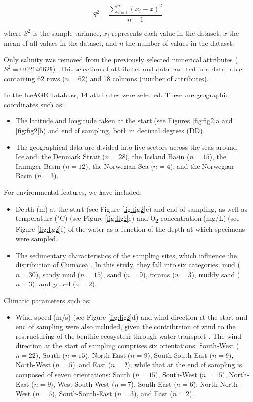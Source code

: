 \begin{equation}\label{variance}
    S^2 = \frac{\sum_{i=1}^{n} (x_i - \bar{x})^2}{n-1}
\end{equation}

where $S^2$ is the sample variance, $x_i$ represents each value in the dataset, $\bar{x}$ the mean of all values in the dataset, and $n$ the number of values in the dataset.

Only salinity was removed from the previously selected numerical attributes ($S^2 = 0.02146629$). This selection of attributes and data resulted in a data table containing 62 rows ($n=62$) and 18 columns (number of attributes). 

In the IceAGE database, 14 attributes were selected. These are geographic coordinates such as: 

\begin{itemize}
\item The latitude and longitude taken at the start (see Figures \ref{fig:fig2}a and \ref{fig:fig2}b) and end of sampling, both in decimal degrees (DD).
\item The geographical data are divided into five sectors across the seas around Iceland: the Denmark Strait ($n=28$), the Iceland Basin ($n=15$), the Irminger Basin ($n=12$), the Norwegian Sea ($n=4$), and the Norwegian Basin ($n=3$). 
\end{itemize}

For environmental features, we have included:
\begin{itemize}
\item Depth (m) at the start (see Figure \ref{fig:fig2}c) and end of sampling, as well as temperature ($^\circ$C) (see Figure \ref{fig:fig2}e) and O\textsubscript{2} concentration (mg/L) (see Figure \ref{fig:fig2}f) of the water as a function of the depth at which specimens were sampled. 
\item The sedimentary characteristics of the sampling sites, which influence the distribution of Cumacea \citep{uhlir_adding_2021}. In this study, they fall into six categories: mud ($n=30$), sandy mud ($n=15$), sand ($n=9$), forams ($n=3$), muddy sand ($n=3$), and gravel ($n=2$).
\end{itemize}

Climatic parameters such as: 
\begin{itemize}
\item Wind speed (m/s) (see Figure \ref{fig:fig2}d) and wind direction at the start and end of sampling were also included, given the contribution of wind to the restructuring of the benthic ecosystem through water transport \citep{waga_recent_2020,saeedi_environmental_2022}. The wind direction at the start of sampling comprises six orientations: South-West ($n=22$), South ($n=15$), North-East ($n=9$), South-South-East ($n=9$), North-West ($n=5$), and East ($n=2$); while that at the end of sampling is composed of seven orientations: South ($n=15$), South-West ($n=15$), North-East ($n=9$), West-South-West ($n=7$), South-East ($n=6$), North-North-West ($n=5$), South-South-East ($n=3$), and East ($n=2$). 
\end{itemize}

